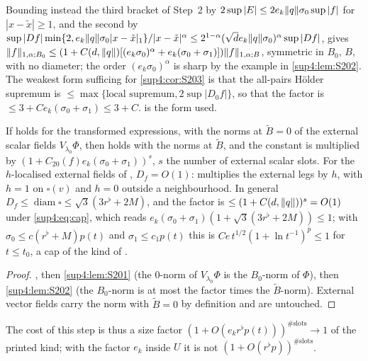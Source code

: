 \begin{remark}\label{sup4:rem:S202}
Bounding instead the third bracket of Step~2 by $2\sup|E|\le2e_k\lVert q\rVert\sigma_0\sup|f|$ for $|x-\tilde x|\ge1$, and the second by $\sup|Df|\min\{2,e_k\lVert q\rVert\sigma_0|x-\tilde x|_1\}/|x-\tilde x|^\alpha\le2^{1-\alpha}(\sqrt de_k\lVert q\rVert\sigma_0)^\alpha\sup|Df|$, gives $\lVert f\rVert_{1,\alpha;B_0}\le(1+C(d,\lVert q\rVert)[(e_k\sigma_0)^\alpha+e_k(\sigma_0+\sigma_1)])\lVert f\rVert_{1,\alpha;B}$, symmetric in $B_0$, $B$, with no diameter; the order $(e_k\sigma_0)^\alpha$ is sharp by the example in \cref{sup4:lem:S202}. The weakest form sufficing for \cref{sup4:cor:S203} is that the all-pairs H\"older supremum is $\le\max\{\text{local supremum},2\sup|D_0f|\}$, so that the factor is $\le3+Ce_k(\sigma_0+\sigma_1)\le3+C$.  is the form used.
\end{remark}

\begin{corollary}\label{sup4:cor:S203}
If \cite[(3.3)]{Ba3} holds for the transformed expressions, with the norms \cite[(1.32)]{Ba3} at $\tilde B=0$ of the external scalar fields $V_{\lambda_0}\Phi$, then \cite[(3.2)]{Ba3} holds with the norms \cite[(1.32)]{Ba3} at $\tilde B$, and the constant is multiplied by $(1+C_{20}(f)e_k(\sigma_0+\sigma_1))^s$, $s$ the number of external scalar slots. For the $h$-localised external fields of \cite[(3.2)]{Ba3}, $D_f=O(1)$: \cite[(1.33)]{Ba3} multiplies the external legs by $h$, with $h=1$ on $\square(v)$ and $h=0$ outside a neighbourhood. In general $D_f\le\operatorname{diam}\square\le\sqrt3(3r^\flat+2M)$, and the factor is $\le(1+C(d,\lVert q\rVert))^s=O(1)$ under \eqref{sup4:eq:cap}, which reads $e_k(\sigma_0+\sigma_1)(1+\sqrt3(3r^\flat+2M))\le1$; with $\sigma_0\le c(r^\flat+M)p(t)$ and $\sigma_1\le c_1p(t)$ this is $Ce\,t^{1/2}(1+\ln t^{-1})^{\bar p}\le1$ for $t\le t_0$, a cap of the kind of \cite[p.~412]{Ba3}.
\end{corollary}

\begin{proof}
, then \cref{sup4:lem:S201} (the $0$-norm of $V_{\lambda_0}\Phi$ is the $B_0$-norm of $\Phi$), then \cref{sup4:lem:S202} (the $B_0$-norm is at most the factor times the $\tilde B$-norm). External vector fields carry the norm with $\tilde B=0$ by definition \cite[p.~420]{Ba3} and are untouched.
\end{proof}

The cost of this step is thus a size factor $(1+O(e_kr^\flat p(t)))^{\#\text{slots}}\to1$ of the printed kind; with the factor $e_k$ inside $U$ it is not $(1+O(r^\flat p))^{\#\text{slots}}$.
